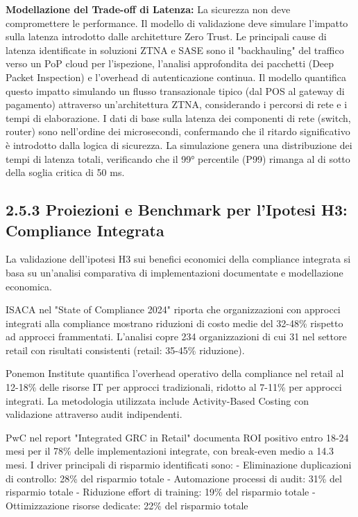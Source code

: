 \textbf{Modellazione del Trade-off di Latenza:}
La sicurezza non deve compromettere le performance. Il modello di validazione deve simulare l'impatto sulla latenza introdotto dalle architetture Zero Trust. Le principali cause di latenza identificate in soluzioni ZTNA e SASE sono il "backhauling" del traffico verso un PoP cloud per l'ispezione, l'analisi approfondita dei pacchetti (Deep Packet Inspection) e l'overhead di autenticazione continua. Il modello quantifica questo impatto simulando un flusso transazionale tipico (dal POS al gateway di pagamento) attraverso un'architettura ZTNA, considerando i percorsi di rete e i tempi di elaborazione. I dati di base sulla latenza dei componenti di rete (switch, router) sono nell'ordine dei microsecondi, confermando che il ritardo significativo è introdotto dalla logica di sicurezza. La simulazione genera una distribuzione dei tempi di latenza totali, verificando che il 99° percentile (P99) rimanga al di sotto della soglia critica di 50 ms.   

\subsection{\texorpdfstring{2.5.3 Proiezioni e Benchmark per l'Ipotesi H3: Compliance Integrata}{2.5.3 Proiezioni e Benchmark per l'Ipotesi H3: Compliance Integrata}}\label{proiezioni-e-benchmark-per-lipotesi-h3-compliance-integrata}

La validazione dell'ipotesi H3 sui benefici economici della compliance
integrata si basa su un'analisi comparativa di implementazioni
documentate e modellazione economica.

ISACA\supercite{isaca2024compliance} nel "State of Compliance 2024" riporta che organizzazioni con
approcci integrati alla compliance mostrano riduzioni di costo medie del
32-48\% rispetto ad approcci frammentati. L'analisi copre 234
organizzazioni di cui 31 nel settore retail con risultati consistenti
(retail: 35-45\% riduzione).

Ponemon Institute\supercite{ponemon2024cost} quantifica l'overhead operativo della compliance nel
retail al 12-18\% delle risorse IT per approcci tradizionali, ridotto al
7-11\% per approcci integrati. La metodologia utilizzata include
Activity-Based Costing con validazione attraverso audit indipendenti.

PwC\supercite{pwc2024integrated} nel report "Integrated GRC in Retail" documenta ROI positivo
entro 18-24 mesi per il 78\% delle implementazioni integrate, con
break-even medio a 14.3 mesi. I driver principali di risparmio
identificati sono: - Eliminazione duplicazioni di controllo: 28\% del
risparmio totale - Automazione processi di audit: 31\% del risparmio
totale - Riduzione effort di training: 19\% del risparmio totale -
Ottimizzazione risorse dedicate: 22\% del risparmio totale

